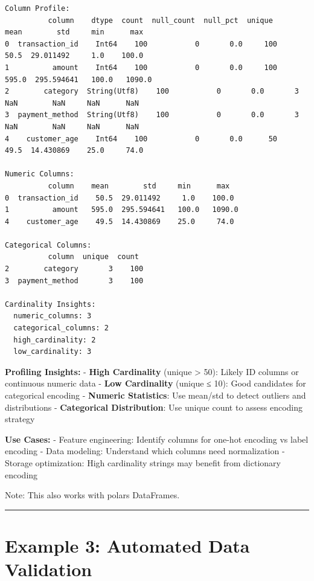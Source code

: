 \documentclass[
  letterpaper,
]{scrbook}
\begin{document}
\begin{verbatim}
Column Profile:
          column    dtype  count  null_count  null_pct  unique      mean        std     min      max
0  transaction_id    Int64    100           0       0.0     100      50.5  29.011492     1.0    100.0
1          amount    Int64    100           0       0.0     100     595.0  295.594641   100.0   1090.0
2        category  String(Utf8)    100           0       0.0       3       NaN        NaN     NaN      NaN
3  payment_method  String(Utf8)    100           0       0.0       3       NaN        NaN     NaN      NaN
4    customer_age    Int64    100           0       0.0      50      49.5  14.430869    25.0     74.0

Numeric Columns:
          column    mean        std     min      max
0  transaction_id    50.5  29.011492     1.0    100.0
1          amount   595.0  295.594641   100.0   1090.0
4    customer_age    49.5  14.430869    25.0     74.0

Categorical Columns:
          column  unique  count
2        category       3    100
3  payment_method       3    100

Cardinality Insights:
  numeric_columns: 3
  categorical_columns: 2
  high_cardinality: 2
  low_cardinality: 3
\end{verbatim}

\textbf{Profiling Insights:} - \textbf{High Cardinality} (unique
\textgreater{} 50): Likely ID columns or continuous numeric data -
\textbf{Low Cardinality} (unique ≤ 10): Good candidates for categorical
encoding - \textbf{Numeric Statistics}: Use mean/std to detect outliers
and distributions - \textbf{Categorical Distribution}: Use unique count
to assess encoding strategy

\textbf{Use Cases:} - Feature engineering: Identify columns for one-hot
encoding vs label encoding - Data modeling: Understand which columns
need normalization - Storage optimization: High cardinality strings may
benefit from dictionary encoding

Note: This also works with polars DataFrames.

\begin{center}\rule{0.5\linewidth}{0.5pt}\end{center}

\section{Example 3: Automated Data
Validation}\label{example-3-automated-data-validation}
\end{document}
